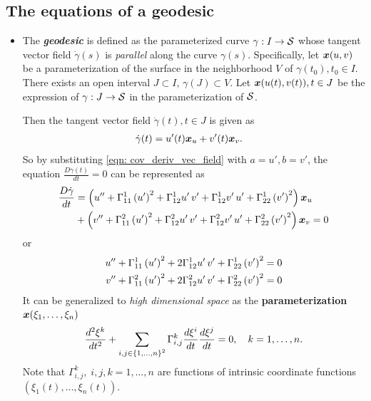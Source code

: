 \documentclass[11pt]{article}
\begin{document}
\subsection{The equations of a geodesic}
\begin{itemize}
\item The \emph{\textbf{geodesic}} is defined as the parameterized curve $\gamma: I \rightarrow {\mathcal S}$ whose tangent vector field $\dot{\gamma}(s)$ is \emph{parallel} along the curve $\gamma(s)$.  Specifically, let $\boldsymbol{x}(u,v)$ be a parameterization of the surface in the neighborhood $V$ of $\gamma(t_{0}), t_{0}\in I$. There exists an open interval $J \subset I$, $\gamma(J) \subset V$. Let $\boldsymbol{x}(u(t), v(t)), t\in J$ be the expression of $\gamma: J  \rightarrow {\mathcal S}$ in the parameterization of ${\mathcal S}$. 

Then the tangent vector field $\dot{\gamma}(t), t\in J$ is given as 
\begin{align*}
\dot{\gamma}(t) &= u'(t)\boldsymbol{x}_{u} + v'(t)\boldsymbol{x}_{v}.
\end{align*}
So by substituting \eqref{eqn: cov_deriv_vec_field} with $a= u', b= v'$,  the equation  $\frac{D\dot{\gamma}(t)}{dt} = 0$ can be represented as
\begin{align*}
\frac{D\dot{\gamma}}{dt} &= \left(u'' + \Gamma_{11}^{1}\left(u'\right)^{2} + \Gamma_{12}^{1}u'\,v' + \Gamma_{12}^{1}v'\,u' +  \Gamma_{22}^{1}\left(v'\right)^{2} \right) \boldsymbol{x}_{u} \nonumber\\
&+ \left(v'' + \Gamma_{11}^{2}\left(u'\right)^{2}+ \Gamma_{12}^{2}u'\,v'+ \Gamma_{12}^{2}v'\,u'+  \Gamma_{22}^{2}\left(v'\right)^{2} \right) \boldsymbol{x}_{v} = 0
\end{align*}
or 
\begin{align}
u'' + \Gamma_{11}^{1}\left(u'\right)^{2} + 2\Gamma_{12}^{1}u'\,v' +  \Gamma_{22}^{1}\left(v'\right)^{2} &=0\nonumber\\
v'' + \Gamma_{11}^{2}\left(u'\right)^{2}+ 2\Gamma_{12}^{2}u'\,v'+  \Gamma_{22}^{2}\left(v'\right)^{2}&=0\label{eqn: geo_diff_eqn}
\end{align}
It can be generalized to \emph{high dimensional space} as the \textbf{parameterization} $\boldsymbol{x}(\xi_{1},\ldots, \xi_{n})$
\begin{align}
\frac{d^{2} \xi^{k}}{dt^{2}} + \sum_{i,j \in \left\{1,\ldots,n\right\}^{2}}\Gamma_{i,j}^{k}\frac{d\xi^{i}}{dt}\frac{d\xi^{j}}{dt} = 0, \quad k=1,\ldots, n.\label{eqn: geo_diff_eqn_high}
\end{align} 
Note that $\Gamma_{i,j}^{k},\; i,j,k=1,\ldots,n$ are functions of intrinsic coordinate functions $(\xi_{1}(t),\ldots, \xi_{n}(t)).$ 


\end{itemize}
\end{document}
